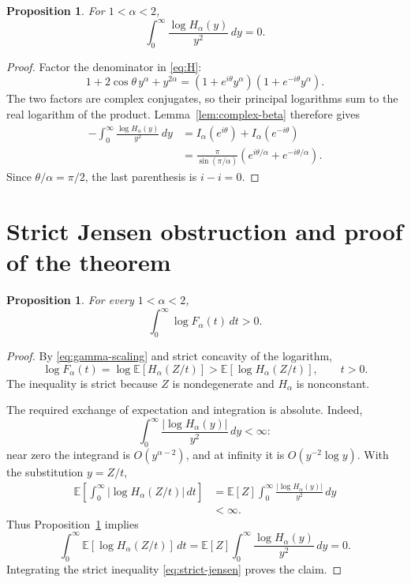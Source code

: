 \documentclass[11pt]{article}
\newtheorem{proposition}[theorem]{Proposition}
\theoremstyle{remark}
\newcommand{\E}{\mathbb{E}}
\begin{document}
\begin{proposition}\label{prop:cancellation}
For $1<\alpha<2$,
\begin{equation}\label{eq:cancellation}
 \int_0^\infty
  \frac{\log H_\alpha(y)}{y^2}\,dy=0.
\end{equation}
\end{proposition}

\begin{proof}
Factor the denominator in \eqref{eq:H}:
\[
 1+2\cos\theta\,y^\alpha+y^{2\alpha}
 =(1+e^{i\theta}y^\alpha)
  (1+e^{-i\theta}y^\alpha).
\]
The two factors are complex conjugates, so their principal logarithms
sum to the real logarithm of the product.  Lemma~\ref{lem:complex-beta}
therefore gives
\begin{align*}
 -\int_0^\infty
  \frac{\log H_\alpha(y)}{y^2}\,dy
 &=I_\alpha(e^{i\theta})+I_\alpha(e^{-i\theta}) \\
 &=\frac{\pi}{\sin(\pi/\alpha)}
   \left(e^{i\theta/\alpha}
         +e^{-i\theta/\alpha}\right).
\end{align*}
Since $\theta/\alpha=\pi/2$, the last parenthesis is
$i-i=0$.
\end{proof}

\section{Strict Jensen obstruction and proof of the theorem}

\begin{proposition}\label{prop:jensen}
For every $1<\alpha<2$,
\[
 \int_0^\infty\log F_\alpha(t)\,dt>0.
\]
\end{proposition}

\begin{proof}
By \eqref{eq:gamma-scaling} and strict concavity of the logarithm,
\begin{equation}\label{eq:strict-jensen}
 \log F_\alpha(t)
 =\log\E[H_\alpha(Z/t)]
 >\E[\log H_\alpha(Z/t)],
 \qquad t>0.
\end{equation}
The inequality is strict because $Z$ is nondegenerate and
$H_\alpha$ is nonconstant.

The required exchange of expectation and integration is absolute.
Indeed,
\[
 \int_0^\infty
  \frac{|\log H_\alpha(y)|}{y^2}\,dy<\infty:
\]
near zero the integrand is $O(y^{\alpha-2})$, and at infinity it is
$O(y^{-2}\log y)$.  With the substitution $y=Z/t$,
\begin{align*}
 \E\left[
  \int_0^\infty|\log H_\alpha(Z/t)|\,dt
 \right]
 &=\E[Z]\int_0^\infty
   \frac{|\log H_\alpha(y)|}{y^2}\,dy \\
 &<\infty.
\end{align*}
Thus Proposition~\ref{prop:cancellation} implies
\[
 \int_0^\infty
  \E[\log H_\alpha(Z/t)]\,dt
 =\E[Z]\int_0^\infty
   \frac{\log H_\alpha(y)}{y^2}\,dy
 =0.
\]
Integrating the strict inequality \eqref{eq:strict-jensen} proves
the claim.
\end{proof}
\end{document}
